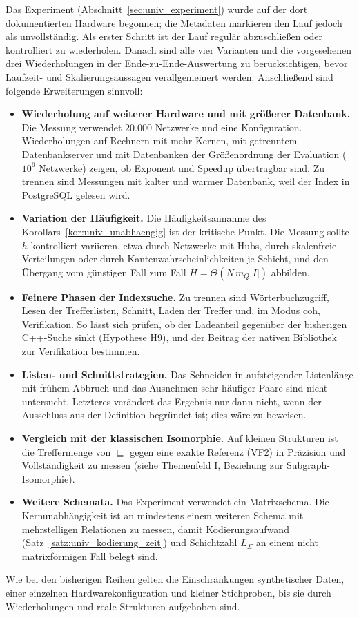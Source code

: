 \documentclass[a4paper,12pt, twoside]{report}
\theoremstyle{definition}
\begin{document}
Das Experiment (Abschnitt~\ref{sec:univ_experiment}) wurde auf der dort dokumentierten Hardware begonnen; die Metadaten markieren den Lauf jedoch als unvollständig. Als erster Schritt ist der Lauf regulär abzuschließen oder kontrolliert zu wiederholen. Danach sind alle vier Varianten und die vorgesehenen drei Wiederholungen in der Ende-zu-Ende-Auswertung zu berücksichtigen, bevor Laufzeit- und Skalierungsaussagen verallgemeinert werden. Anschließend sind folgende Erweiterungen sinnvoll:
\begin{itemize}
	\item \textbf{Wiederholung auf weiterer Hardware und mit größerer Datenbank.} Die Messung verwendet $20.000$ Netzwerke und eine Konfiguration. Wiederholungen auf Rechnern mit mehr Kernen, mit getrenntem Datenbankserver und mit Datenbanken der Größenordnung der Evaluation ($10^6$ Netzwerke) zeigen, ob Exponent und Speedup übertragbar sind. Zu trennen sind Messungen mit kalter und warmer Datenbank, weil der Index in PostgreSQL gelesen wird.
	\item \textbf{Variation der Häufigkeit.} Die Häufigkeitsannahme des Korollars~\ref{kor:univ_unabhaengig} ist der kritische Punkt. Die Messung sollte $h$ kontrolliert variieren, etwa durch Netzwerke mit Hubs, durch skalenfreie Verteilungen oder durch Kantenwahrscheinlichkeiten je Schicht, und den Übergang vom günstigen Fall zum Fall $H=\Theta(N\,m_Q|I|)$ abbilden.
	\item \textbf{Feinere Phasen der Indexsuche.} Zu trennen sind Wörterbuchzugriff, Lesen der Trefferlisten, Schnitt, Laden der Treffer und, im Modus coh, Verifikation. So lässt sich prüfen, ob der Ladeanteil gegenüber der bisherigen C++-Suche sinkt (Hypothese H9), und der Beitrag der nativen Bibliothek zur Verifikation bestimmen.
	\item \textbf{Listen- und Schnittstrategien.} Das Schneiden in aufsteigender Listenlänge mit frühem Abbruch und das Ausnehmen sehr häufiger Paare sind nicht untersucht. Letzteres verändert das Ergebnis nur dann nicht, wenn der Ausschluss aus der Definition begründet ist; dies wäre zu beweisen.
	\item \textbf{Vergleich mit der klassischen Isomorphie.} Auf kleinen Strukturen ist die Treffermenge von $\sqsubseteq$ gegen eine exakte Referenz (VF2) in Präzision und Vollständigkeit zu messen (siehe Themenfeld I, Beziehung zur Subgraph-Isomorphie).
	\item \textbf{Weitere Schemata.} Das Experiment verwendet ein Matrixschema. Die Kernunabhängigkeit ist an mindestens einem weiteren Schema mit mehrstelligen Relationen zu messen, damit Kodierungsaufwand (Satz~\ref{satz:univ_kodierung_zeit}) und Schichtzahl $L_\Sigma$ an einem nicht matrixförmigen Fall belegt sind.
\end{itemize}
Wie bei den bisherigen Reihen gelten die Einschränkungen synthetischer Daten, einer einzelnen Hardwarekonfiguration und kleiner Stichproben, bis sie durch Wiederholungen und reale Strukturen aufgehoben sind.
\end{document}
